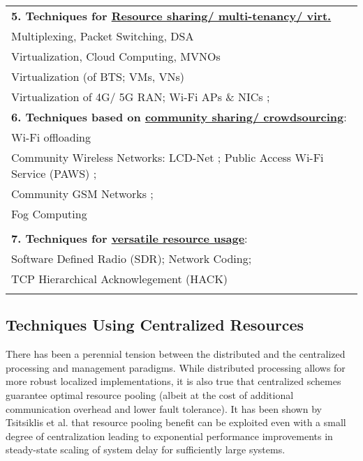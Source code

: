 \documentclass{sigcomm-alternate}
\begin{document}
\begin{table}[!ht]
\begin{tabular}{p{8.3cm}}
\\
\textbf{5. Techniques for \underline{Resource sharing/ multi-tenancy/ virt.}}
\\
Multiplexing, Packet Switching, DSA\\ 
Virtualization, Cloud Computing, MVNOs\\
Virtualization (of BTS; VMs, VNs) \cite{doyle2014spectrum}\\
Virtualization of 4G/ 5G RAN; Wi-Fi APs \& NICs \cite{qadir2014building};


\\
\textbf{6. Techniques based on \underline{community sharing/ crowdsourcing}}:\\
Wi-Fi offloading \cite{lee2010mobile}\\
Community Wireless Networks: LCD-Net \cite{sathiaseelan2013lcd}; Public Access Wi-Fi Service (PAWS) \cite{sathiaseelan2014feasibility};\\Community GSM Networks \cite{hasan2014gsm};\\
Fog Computing \cite{bonomi2012fog}\\

\\
\textbf{7. Techniques for \underline{versatile resource usage}}:\\

Software Defined Radio (SDR); Network Coding;\\
TCP Hierarchical Acknowlegement (HACK) \cite{salameh2014hack}\\

\\
\hline
\end{tabular}
\end{table}

\subsection{Techniques Using Centralized Resources}

There has been a perennial tension between the distributed and the centralized processing and management paradigms. While distributed processing allows for more robust localized implementations, it is also true that centralized schemes guarantee optimal resource pooling (albeit at the cost of additional communication overhead and lower fault tolerance). It has been shown by Tsitsiklis et al. \cite{tsitsiklis2012power} that resource pooling benefit can be exploited even with a  small degree of centralization leading to exponential performance improvements in steady-state scaling of system delay for sufficiently large systems. 
\end{document}
